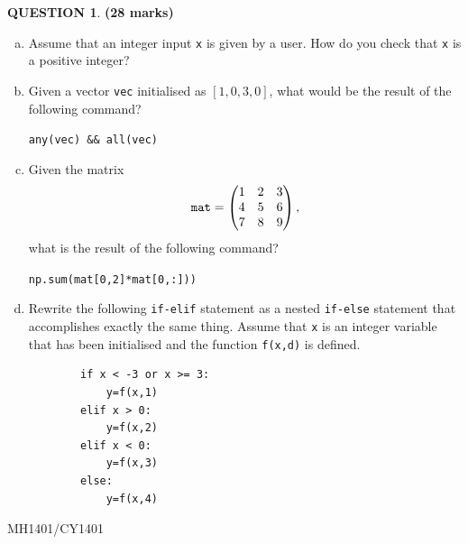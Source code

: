 \documentclass[a4paper,12pt]{article}
\theoremstyle{definition}
\newtheorem{ques}[dummy]{QUESTION}
\theoremstyle{plain}
\newcommand{\ttx}[1]{\texttt{#1}}
\begin{document}
\begin{ques}\hfill \textbf{(28 marks)}\\
	\begin{enumerate}[(a)]
		\item Assume that an integer input \texttt{x} is given by a user. How do you check that \ttx{x} is a positive integer?
		
		\item Given a vector \ttx{vec} initialised as $[1, 0, 3, 0]$, what would be the result of the following command?\vspace*{1em}
		
		\texttt{any(vec) \&\& all(vec)}
		
		\item Given the matrix\begin{equation*}
		\text{\ttx{mat}} = \begin{pmatrix*}
		1 & 2 & 3\\4 & 5 & 6\\7 & 8 & 9
		\end{pmatrix*},
		\end{equation*}
		what is the result of the following command?\vspace*{1em}
		
		\texttt{np.sum(mat[0,2]*mat[0,:]))}
		
		\item Rewrite the following \texttt{if-elif} statement as a nested \texttt{if-else} statement that accomplishes exactly the same thing. Assume that \texttt{x} is an integer variable that has been initialised and the function \texttt{f(x,d)} is defined.
		\begin{verbatim}
		if x < -3 or x >= 3:
		    y=f(x,1)
		elif x > 0:
		    y=f(x,2)
		elif x < 0:
		    y=f(x,3)
		else:
		    y=f(x,4)
		\end{verbatim}
	\end{enumerate}
\end{ques}

\newpage

\hfill MH1401/CY1401\vspace*{0.5em}
\end{document}
